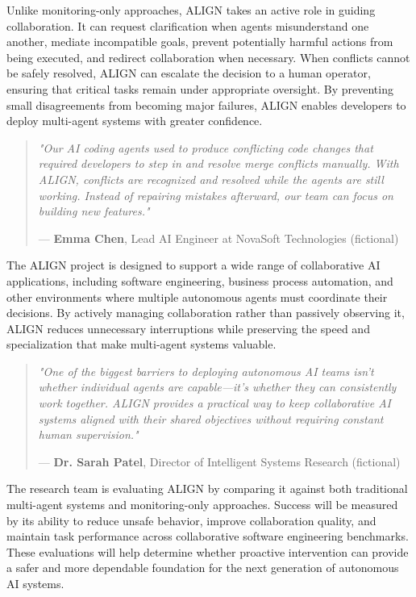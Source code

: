 \documentclass[11pt]{article}
\begin{document}
{Unlike monitoring-only approaches, ALIGN takes an active role in guiding collaboration. It can request clarification when agents misunderstand one another, mediate incompatible goals, prevent potentially harmful actions from being executed, and redirect collaboration when necessary. When conflicts cannot be safely resolved, ALIGN can escalate the decision to a human operator, ensuring that critical tasks remain under appropriate oversight. By preventing small disagreements from becoming major failures, ALIGN enables developers to deploy multi-agent systems with greater confidence.

\begin{quote}
\emph{"Our AI coding agents used to produce conflicting code changes that required developers to step in and resolve merge conflicts manually. With ALIGN, conflicts are recognized and resolved while the agents are still working. Instead of repairing mistakes afterward, our team can focus on building new features."}

\hfill--- \textbf{Emma Chen}, Lead AI Engineer at NovaSoft Technologies (fictional)
\end{quote}

The ALIGN project is designed to support a wide range of collaborative AI applications, including software engineering, business process automation, and other environments where multiple autonomous agents must coordinate their decisions. By actively managing collaboration rather than passively observing it, ALIGN reduces unnecessary interruptions while preserving the speed and specialization that make multi-agent systems valuable.

\begin{quote}
\emph{"One of the biggest barriers to deploying autonomous AI teams isn't whether individual agents are capable—it's whether they can consistently work together. ALIGN provides a practical way to keep collaborative AI systems aligned with their shared objectives without requiring constant human supervision."}

\hfill--- \textbf{Dr. Sarah Patel}, Director of Intelligent Systems Research (fictional)
\end{quote}

The research team is evaluating ALIGN by comparing it against both traditional multi-agent systems and monitoring-only approaches. Success will be measured by its ability to reduce unsafe behavior, improve collaboration quality, and maintain task performance across collaborative software engineering benchmarks. These evaluations will help determine whether proactive intervention can provide a safer and more dependable foundation for the next generation of autonomous AI systems.

}
\end{document}
